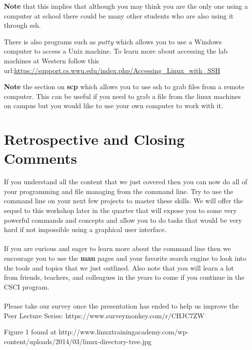 \documentclass[oneside]{book}
\begin{document}
    \textbf{Note} that this implies that although you may think you are the only one using a computer at school there could be many other students who are also using it through ssh.
    
    There is also programs such as $putty$ which allows you to use a Windows computer to access a Unix machine. 
    To learn more about accessing the lab machines at Western follow this url:\url{https://support.cs.wwu.edu/index.php/Accessing_Linux_with_SSH}
    
    \textbf{Note} the section on \textbf{scp} which allows you to use ssh to grab files from a remote computer. This can be useful if you need to grab a file from the linux machines on campus but you would like to use your own computer to work with it.
    
\newpage
\section{Retrospective and Closing Comments}
    If you understand all the content that we just covered then you can now do all of your programming and file managing from the command line. Try to use the command line on your next few projects to master these skills. We will offer the sequel to this workshop later in the quarter that will expose you to some very powerful commands and concepts and allow you to do tasks that would be very hard if not impossible using a graphical user interface.
    \\
    \\
    If you are curious and eager to learn more about the command line then we encourage you to use the \textbf{man} pages and your favorite search engine to look into the tools and topics that we just outlined. Also note that you will learn a lot from friends, teachers, and colleagues in the years to come if you continue in the CSCI program. 
    \\
    \\
    Please take our survey once the presentation has ended to help us improve the Peer Lecture Series: https://www.surveymonkey.com/r/CHJC7ZW



\newpage
\begin{thebibliography}{10}

	 Figure 1 found at http://www.linuxtrainingacademy.com/wp-content/uploads/2014/03/linux-directory-tree.jpg \\

\end{thebibliography}
\end{document}
